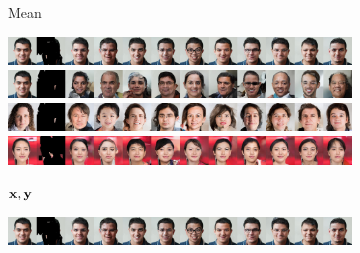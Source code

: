 \begin{figure}[t]
\begin{subfigure}[t]{0.1\textwidth}
    \caption{Mean}
  \end{subfigure}
  \caption{Examples of completions lacking semantic diversity in CoModGAN. Panel
    (a) shows the true image and the masked version on which the completions are
    conditioned. Panel (b) shows 10 completions sampled randomly from the
    CoModGAN model. Panel (c) shows the mean image computed from 100 sampled
    completions. On each row, the completions are mostly semantically similar to
    eachother yet different from the ground truth image, indicating that they
    are not faithfully representing the true posterior. This behaviour can be
    contrasted with that of IPA in \cref{fig:cigcvae-comodgan-failure-aipo}.}
  \label{fig:cigcvae-comodgan-failure}
  \vspace{.5cm}
  \begin{subfigure}[t]{0.14\textwidth}
    \centering
    \includegraphics[trim=0px 0px 2560px 0px, clip, height=\cmgfailureimgheight]{figs/cigcvae/co_mod_gan_failure/aipo_0_3_2.jpg}
    \includegraphics[trim=0px 0px 2560px 0px, clip, height=\cmgfailureimgheight]{figs/cigcvae/co_mod_gan_failure/aipo_0_4_2.jpg}
    \includegraphics[trim=0px 0px 2560px 0px, clip, height=\cmgfailureimgheight]{figs/cigcvae/co_mod_gan_failure/aipo_1_4_2.jpg}
    \includegraphics[trim=0px 0px 2560px 0px, clip, height=\cmgfailureimgheight]{figs/cigcvae/co_mod_gan_failure/aipo_56_4_12.jpg}
    \caption{${\mathbf{x}}, {\mathbf{y}}$}
  \end{subfigure}
  \begin{subfigure}[t]{0.73\textwidth}
    \centering
    \includegraphics[trim=512px 0px 0px 0px, clip, height=\cmgfailureimgheight]{figs/cigcvae/co_mod_gan_failure/aipo_0_3_2.jpg}

\end{subfigure}
\end{figure}
